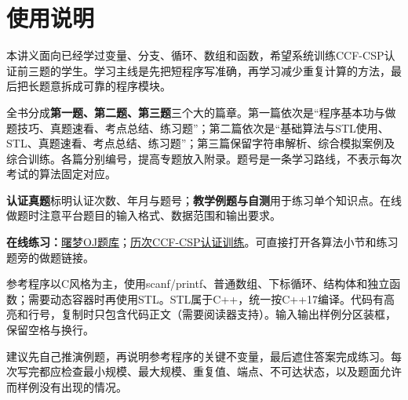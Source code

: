 \section*{使用说明}
本讲义面向已经学过变量、分支、循环、数组和函数，希望系统训练CCF-CSP认证前三题的学生。学习主线是先把短程序写准确，再学习减少重复计算的方法，最后把长题意拆成可靠的程序模块。

全书分成\textbf{第一题、第二题、第三题}三个大的篇章。第一篇依次是“程序基本功与做题技巧、真题速看、考点总结、练习题”；第二篇依次是“基础算法与STL使用、STL、真题速看、考点总结、练习题”；第三篇保留字符串解析、综合模拟案例及综合训练。各篇分别编号，提高专题放入附录。题号是一条学习路线，不表示每次考试的算法固定对应。

\textbf{认证真题}标明认证次数、年月与题号；\textbf{教学例题与自测}用于练习单个知识点。在线做题时注意平台题目的输入格式、数据范围和输出要求。

\textbf{在线练习：}\href{https://oj.shumeng.tech/p}{曙梦OJ题库}；\href{https://oj.shumeng.tech/training/68330d72efce6d5ac2765a62}{历次CCF-CSP认证训练}。可直接打开各算法小节和练习题旁的做题链接。

参考程序以C风格为主，使用scanf/printf、普通数组、下标循环、结构体和独立函数；需要动态容器时再使用STL。STL属于C++，统一按C++17编译。代码有高亮和行号，复制时只包含代码正文（需要阅读器支持）。输入输出样例分区装框，保留空格与换行。

建议先自己推演例题，再说明参考程序的关键不变量，最后遮住答案完成练习。每次写完都应检查最小规模、最大规模、重复值、端点、不可达状态，以及题面允许而样例没有出现的情况。
\tableofcontents
\newpage
